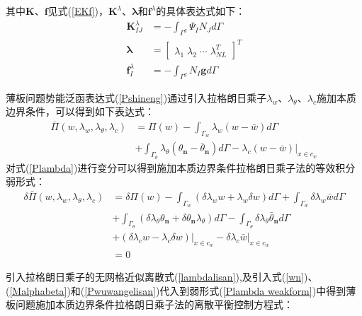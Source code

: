 其中$\pmb{K}$、$\pmb{f}$见式(\ref{EKf})，$\pmb{K}^{\lambda}$、$\pmb{\lambda}$和$\pmb{f}^{\lambda}$的具体表达式如下：
\begin{subequations}
\begin{align}
    \pmb K_{I\!J}^{\lambda}&=-\int_{\Gamma^g}\Psi_IN_Jd\Gamma\\
    \pmb{\lambda}&=\left[\begin{matrix}\lambda_1\;\lambda_2\;\dotsb\;\lambda_{N\!L}^T\end{matrix}\right]^T\\
    \pmb f_I^{\lambda}&=-\int_{\Gamma^g}N_I\pmb{g}d\Gamma
\end{align}
\end{subequations}\par
薄板问题势能泛函表达式(\ref{Pshineng})通过引入拉格朗日乘子$\lambda_w$、$\lambda_\theta$、$\lambda_c$施加本质边界条件，可以得到如下表达式：
\begin{equation}\label{Plambda}
\begin{split}
    \bar{\Pi}(w,\lambda_w,\lambda_{\theta},\lambda_c)&=\Pi(w)-\int_{\Gamma_w}\lambda_w(w-\bar{w})d\Gamma\\
    &+\int_{\Gamma_{\theta}}\lambda_{\theta}(\theta_{\pmb n}-\bar{\theta}_{\pmb n})d\Gamma-\lambda_c(w-\bar{w})\vert_{x\in c_w}
\end{split}
\end{equation}
对式(\ref{Plambda})进行变分可以得到施加本质边界条件拉格朗日乘子法的等效积分弱形式：
\begin{equation}\label{Plambda weakform}
\begin{split}
    \delta\bar{\Pi}(w,\lambda_w,\lambda_{\theta},\lambda_c)&=\delta\Pi(w)-\int_{\Gamma_w}(\delta\lambda_w w+\lambda_w\delta w)d\Gamma+\int_{\Gamma_w}\delta\lambda_w\bar{w}d\Gamma\\
&+\int_{\Gamma_{\theta}}(\delta\lambda_{\theta}\theta_{\pmb n}+\delta\theta_{\pmb n}\lambda_{\theta})d\Gamma-\int_{\Gamma_{\theta}}\delta\lambda_{\theta}\bar{\theta}_{\pmb n}d\Gamma\\
&+(\delta\lambda_c w-\lambda_c\delta w)\vert_{x\in c_w}-\delta\lambda_c\bar{w}\vert_{x\in c_w}\\
&=0
\end{split}
\end{equation}\par
引入拉格朗日乘子的无网格近似离散式(\ref{lambdalisan}),及引入式(\ref{wn})、(\ref{Malphabeta})和(\ref{Pwuwangelisan})代入到弱形式(\ref{Plambda weakform})中得到薄板问题施加本质边界条件拉格朗日乘子法的离散平衡控制方程式：
